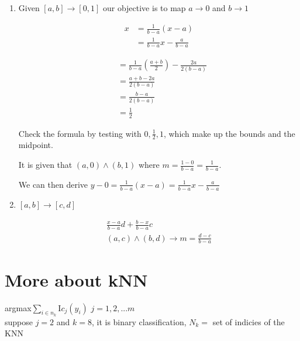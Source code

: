 \begin{enumerate}
    \item Given $[a,b] \rightarrow [0,1]$ our objective is to map $a \rightarrow 0$ and $b \rightarrow 1$
    
    \begin{align*}
       x&=\frac{1}{b-a}(x-a) \\
        &=\frac{1}{b-a}x-\frac{a}{b-a}
    \end{align*}

    \begin{center}
    \end{center}

    \begin{center}
        \begin{align*}
        &=\frac{1}{b-a}(\frac{a+b}{2})-\frac{2a}{2(b-a)} \\
        &=\frac{a+b-2a}{2(b-a)} \\
        &=\frac{b-a}{2(b-a)} \\
        &=\frac{1}{2}
        \end{align*}
    \end{center}

    Check the formula by testing with $0,\frac{1}{2},1$, which make up the bounds and the midpoint. 
    
    It is given that $(a,0) \land (b,1)$ where $m=\frac{1-0}{b-a}=\frac{1}{b-a}$.
    
    We can then derive $y-0=\frac{1}{b-a}(x-a)= {\frac{1}{b-a}x-\frac{a}{b-a}}$
    \item $[a,b] \rightarrow [c,d]$

    \begin{align*}
       \frac{x-a}{b-a}d + \frac{b-x}{b-a}c \\
       (a,c) \land (b,d) \rightarrow m = \frac{d-c}{b-a}
    \end{align*}
\end{enumerate}
\section{More about kNN}
argmax$\sum_{i \in n_k}^{}$I$c_j(y_i)$ $j={1,2,...m}$ \\
suppose $j=2$ and $k=8$, it is binary classification, $N_k=$ set of indicies of the KNN \\

